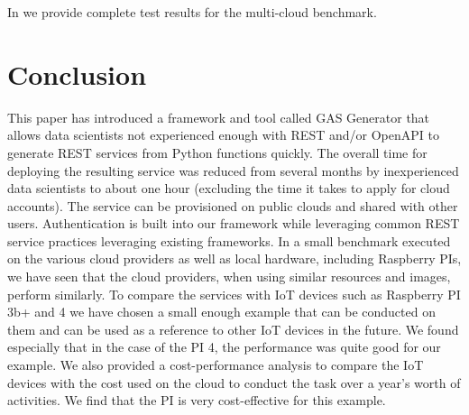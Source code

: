 In  we provide complete test results for the multi-cloud benchmark.

\section{Conclusion}
\label{sec:conclusion}

This paper has introduced a framework and tool called GAS Generator
that allows data scientists not experienced enough with REST and/or
OpenAPI to generate REST services from Python functions quickly. The
overall time for deploying the resulting service was reduced from
several months by inexperienced data scientists to about one hour
(excluding the time it takes to apply for cloud accounts). The
service can be provisioned on public clouds and shared with other
users. Authentication is built into our framework while leveraging
common REST service practices leveraging existing frameworks.
In a small benchmark executed on the
various cloud providers as well as local hardware, including Raspberry
PIs, we have seen that the cloud providers, when using similar
resources and images, perform similarly. To compare the services with
IoT devices such as Raspberry PI 3b+ and 4 we have chosen a small
enough example that can be conducted on them and can be used as a
reference to other IoT devices in the future. We found especially that
in the case of the PI 4, the performance was quite good for our
example. We also provided a cost-performance analysis to compare the
IoT devices with the cost used on the cloud to conduct the task over a
year's worth of activities. We find that the PI is very
cost-effective for this example.

